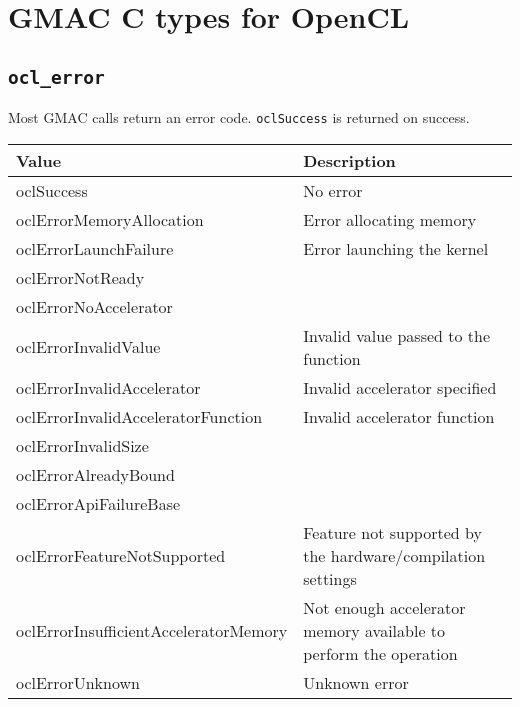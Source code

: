 \section{GMAC C types for OpenCL}

\subsection{\texttt{ocl\_error}}

Most GMAC calls return an error code. \texttt{oclSuccess} is returned on success.

\begin{tabular}{|l|l|}
  \hline
  Value & Description \\
  \hline
  \hline
  oclSuccess                            & No error                             \\
  oclErrorMemoryAllocation              & Error allocating memory              \\
  oclErrorLaunchFailure                 & Error launching the kernel           \\
  oclErrorNotReady                      &                                      \\
  oclErrorNoAccelerator                 &                                      \\
  oclErrorInvalidValue                  & Invalid value passed to the function \\
  oclErrorInvalidAccelerator            & Invalid accelerator specified        \\
  oclErrorInvalidAcceleratorFunction    & Invalid accelerator function         \\
  oclErrorInvalidSize                   &                                      \\
  oclErrorAlreadyBound                  &                                      \\
  oclErrorApiFailureBase                &                                      \\
  oclErrorFeatureNotSupported           & Feature not supported by the hardware\slash{}compilation
                                          settings                             \\
  oclErrorInsufficientAcceleratorMemory & Not enough accelerator memory available to perform the 
                                          operation                            \\
  oclErrorUnknown                       & Unknown error                        \\
  \hline
\end{tabular}

